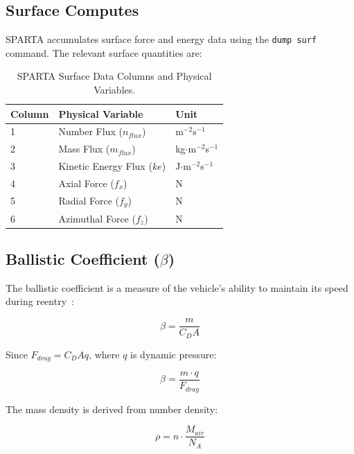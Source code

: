 \subsection{Surface Computes}
SPARTA accumulates surface force and energy data using the \texttt{dump surf} command. The relevant surface quantities are:

\begin{table}[H]
    \centering
    \caption{SPARTA Surface Data Columns and Physical Variables.}
    \label{tab:surface_data}
    \begin{tabular}{|l|l|l|}
        \hline
        \textbf{Column} & \textbf{Physical Variable} & \textbf{Unit} \\ \hline
        1 & Number Flux ($n_{flux}$) & m$^{-2}$s$^{-1}$ \\ \hline
        2 & Mass Flux ($m_{flux}$) & kg$\cdot$m$^{-2}$s$^{-1}$ \\ \hline
        3 & Kinetic Energy Flux ($ke$) & J$\cdot$m$^{-2}$s$^{-1}$ \\ \hline
        4 & Axial Force ($f_x$) & N \\ \hline
        5 & Radial Force ($f_y$) & N \\ \hline
        6 & Azimuthal Force ($f_z$) & N \\ \hline
    \end{tabular}
\end{table}

\subsection{Ballistic Coefficient (\texorpdfstring{$\beta$}{beta})}
\label{sec:ballistic}
The ballistic coefficient is a measure of the vehicle's ability to maintain its speed during reentry~\cite{AndersonHypersonic}:

\begin{equation}
    \beta = \frac{m}{C_D A}
\end{equation}

Since $F_{drag} = C_D A q$, where $q$ is dynamic pressure:

\begin{equation}
    \beta = \frac{m \cdot q}{F_{drag}}
\end{equation}

The mass density is derived from number density:

\begin{equation}
    \rho = n \cdot \frac{M_{air}}{N_A}
\end{equation}

